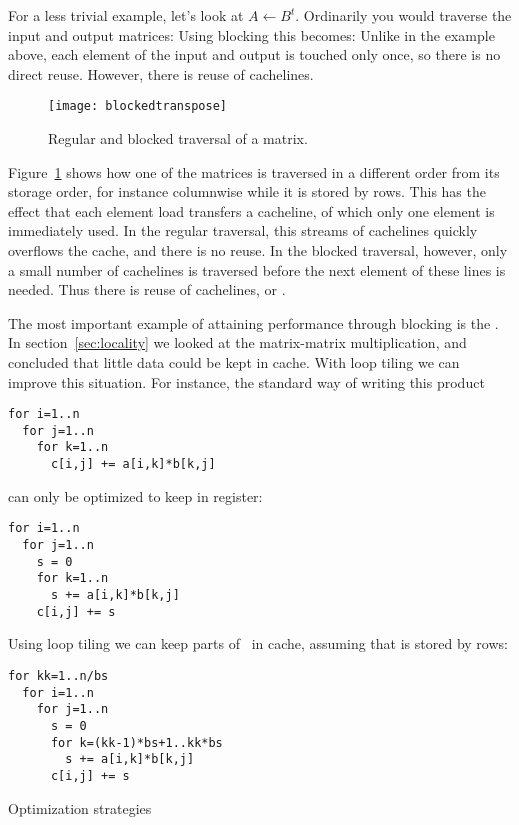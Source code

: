 For a less trivial example, let's look at
 $A\leftarrow B^t$. Ordinarily you would traverse
the input and output matrices:
%
%
Using blocking this becomes:
%
%
Unlike in the example above, each element of the input and output is
touched only once, so there is no direct reuse. However, there is
reuse of cachelines. 

\begin{figure}[ht]
  \texttt{[image: blockedtranspose]}
  \caption{Regular and blocked traversal of a matrix.}
  \label{fig:blockedtranspose}
\end{figure}
Figure~\ref{fig:blockedtranspose} shows how one of the matrices is
traversed in a different order from its storage order, for instance
columnwise while it is stored by rows. This has the effect that each
element load transfers a cacheline, of which only one element is
immediately used. In the regular traversal, this streams of cachelines
quickly overflows the cache, and there is no reuse. In the blocked
traversal, however, only a small number of cachelines is traversed
before the next element of these lines is needed. Thus there is reuse
of cachelines, or .

The most important example of attaining performance through blocking
is the .
In section~\ref{sec:locality} we looked at the matrix-matrix
multiplication, and concluded that little data could be kept in
cache. With loop tiling we can improve this situation. For instance,
the standard way of writing this product
\begin{lstlisting}
for i=1..n
  for j=1..n
    for k=1..n
      c[i,j] += a[i,k]*b[k,j]
\end{lstlisting}
can only be optimized to keep  in register:
\begin{lstlisting}
for i=1..n
  for j=1..n
    s = 0
    for k=1..n
      s += a[i,k]*b[k,j]
    c[i,j] += s
\end{lstlisting}
Using loop tiling we can keep parts of~ in cache,
assuming that  is stored by rows:
\begin{lstlisting}
for kk=1..n/bs
  for i=1..n
    for j=1..n
      s = 0
      for k=(kk-1)*bs+1..kk*bs
        s += a[i,k]*b[k,j]
      c[i,j] += s
\end{lstlisting}


 {Optimization strategies}
\label{sec:scalar-opt}

